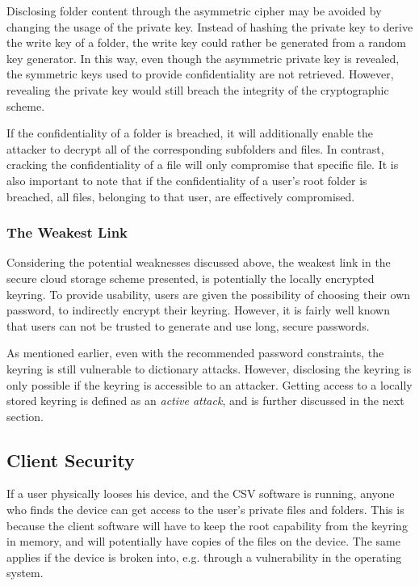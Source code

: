 \documentclass[pdftex,english,10pt,b5paper,twoside]{book}
\begin{document}
Disclosing folder content through the asymmetric cipher may be avoided by
changing the usage of the private key. Instead of hashing the private key to
derive the write key of a folder, the write key could rather be generated from
a random key generator. In this way, even though the asymmetric private key is
revealed, the symmetric keys used to provide confidentiality are not retrieved.
However, revealing the private key would still breach the integrity of the
cryptographic scheme.

If the confidentiality of a folder is breached, it will additionally enable the
attacker to decrypt all of the corresponding subfolders and files. In
contrast, cracking the confidentiality of a file will only compromise that
specific file. It is also important to note that if the confidentiality of a
user's root folder is breached, all files, belonging to that user, are
effectively compromised.


\subsubsection{The Weakest Link}

Considering the potential weaknesses discussed above, the weakest link in the
secure cloud storage scheme presented, is potentially the locally encrypted
keyring. To provide usability, users are given the possibility of choosing
their own password, to indirectly encrypt their keyring. However, it is fairly
well known that users can not be trusted to generate and use long, secure
passwords.

As mentioned earlier, even with the recommended password constraints, the
keyring is still vulnerable to dictionary attacks. However, disclosing the
keyring is only possible if the keyring is accessible to an attacker. Getting
access to a locally stored keyring is defined as an \emph{active attack}, and is
further discussed in the next section.

\subsection{Client Security}

If a user physically looses his device, and the \ac{CSV} software is running,
anyone who finds the device can get access to the user's private files and
folders. This is because the client software will have to keep the root
capability from the keyring in memory, and will potentially have copies of the
files on the device. The same applies if the device is broken into, e.g.
through a vulnerability in the operating system.
\end{document}
